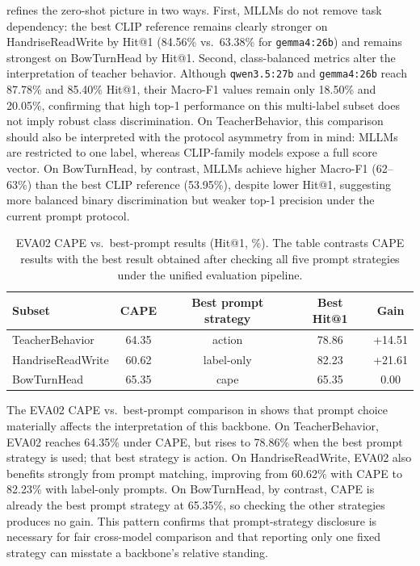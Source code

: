 \documentclass[electronics,article,submit,pdftex,moreauthors]{Definitions/mdpi}
\begin{document}
 refines the zero-shot picture in two ways. First, MLLMs do not remove task dependency: the best CLIP reference remains clearly stronger on HandriseReadWrite by Hit@1 (84.56\% vs.\ 63.38\% for \texttt{gemma4:26b}) and remains strongest on BowTurnHead by Hit@1. Second, class-balanced metrics alter the interpretation of teacher behavior. Although \texttt{qwen3.5:27b} and \texttt{gemma4:26b} reach 87.78\% and 85.40\% Hit@1, their Macro-F1 values remain only 18.50\% and 20.05\%, confirming that high top-1 performance on this multi-label subset does not imply robust class discrimination. On TeacherBehavior, this comparison should also be interpreted with the protocol asymmetry from  in mind: MLLMs are restricted to one label, whereas CLIP-family models expose a full score vector. On BowTurnHead, by contrast, MLLMs achieve higher Macro-F1 (62--63\%) than the best CLIP reference (53.95\%), despite lower Hit@1, suggesting more balanced binary discrimination but weaker top-1 precision under the current prompt protocol.

\begin{table}[H]
\caption{EVA02 CAPE vs.\ best-prompt results (Hit@1, \%). The table contrasts CAPE results with the best result obtained after checking all five prompt strategies under the unified evaluation pipeline.}
\label{tab:eva02_prompt_check}
\centering
\small
\begin{tabular}{l c c c c}
\toprule
\textbf{Subset} & \textbf{CAPE} & \textbf{Best prompt strategy} & \textbf{Best Hit@1} & \textbf{Gain} \\
\midrule
TeacherBehavior & 64.35 & action & 78.86 & +14.51 \\
HandriseReadWrite & 60.62 & label-only & 82.23 & +21.61 \\
BowTurnHead & 65.35 & cape & 65.35 & 0.00 \\
\bottomrule
\end{tabular}
\end{table}

The EVA02 CAPE vs.\ best-prompt comparison in  shows that prompt choice materially affects the interpretation of this backbone. On TeacherBehavior, EVA02 reaches 64.35\% under CAPE, but rises to 78.86\% when the best prompt strategy is used; that best strategy is action. On HandriseReadWrite, EVA02 also benefits strongly from prompt matching, improving from 60.62\% with CAPE to 82.23\% with label-only prompts. On BowTurnHead, by contrast, CAPE is already the best prompt strategy at 65.35\%, so checking the other strategies produces no gain. This pattern confirms that prompt-strategy disclosure is necessary for fair cross-model comparison and that reporting only one fixed strategy can misstate a backbone's relative standing.
\end{document}
